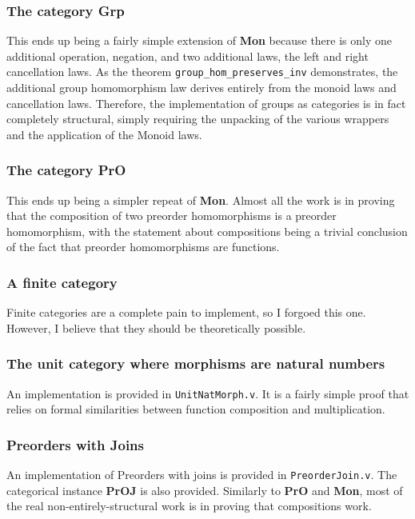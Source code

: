 \documentclass[12pt,twocolumn,oneside]{book}
\begin{document}
\subsubsection{The category \textbf{Grp}}

This ends up being a fairly simple extension of \textbf{Mon} because there is only
one additional operation, negation, and two additional laws, the left and right
cancellation laws. As the theorem \texttt{group\_hom\_preserves\_inv} demonstrates,
the additional group homomorphism law derives entirely from the monoid laws and
cancellation laws. Therefore, the implementation of groups as categories is in
fact completely structural, simply requiring the unpacking of the various wrappers
and the application of the Monoid laws.

\subsubsection{The category \textbf{PrO}}

This ends up being a simpler repeat of \textbf{Mon}. Almost all the work is in
proving that the composition of two preorder homomorphisms is a preorder
homomorphism, with the statement about compositions being a trivial conclusion of
the fact that preorder homomorphisms are functions.

\subsubsection{A finite category}

Finite categories are a complete pain to implement, so I forgoed this one. However,
I believe that they should be theoretically possible.

\subsubsection{The unit category where morphisms are natural numbers}

An implementation is provided in \texttt{UnitNatMorph.v}. It is a fairly simple
proof that relies on formal similarities between function composition and multiplication.

\subsubsection{Preorders with Joins}

An implementation of Preorders with joins is provided in \texttt{PreorderJoin.v}.
The categorical instance \textbf{PrOJ} is also provided. Similarly to \textbf{PrO}
and \textbf{Mon}, most of the real non-entirely-structural work is in proving that
compositions work.
\end{document}
